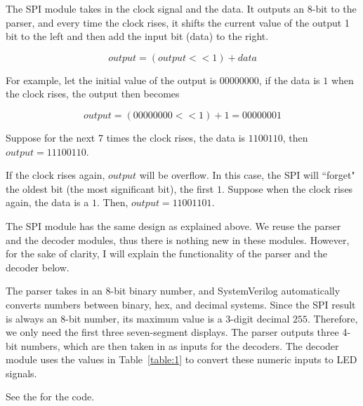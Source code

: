 \documentclass[12pt]{article}
\begin{document}
The SPI module takes in the clock signal and the data. It outputs an 8-bit to the parser, and every time the clock rises, it shifts the current value of the output 1 bit to the left and then add the input bit (data) to the right.

\begin{equation} \label{equation:1}
  output = (output << 1) + data
\end{equation}

For example, let the initial value of the output is $00000000$, if the data is $1$ when the clock rises, the output then becomes

\begin{equation} \label{equation:2}
  output = (00000000 << 1) + 1 = 00000001
\end{equation}

Suppose for the next 7 times the clock rises, the data is $1100110$, then $output = 11100110$.

If the clock rises again, $output$ will be overflow. In this case, the SPI will ``forget" the oldest bit (the most significant bit), the first $1$. Suppose when the clock rises again, the data is a $1$. Then, $output = 11001101$.

The SPI module has the same design as explained above. We reuse the parser and the decoder modules, thus there is nothing new in these modules. However, for the sake of clarity, I will explain the functionality of the parser and the decoder below.

The parser takes in an 8-bit binary number, and SystemVerilog automatically converts numbers between binary, hex, and decimal systems. Since the SPI result is always an 8-bit number, its maximum value is a 3-digit decimal $255$. Therefore, we only need the first three seven-segment displays. The parser outputs three 4-bit numbers, which are then taken in as inputs for the decoders. The decoder module uses the values in Table~\ref{table:1} to convert these numeric inputs to LED signals.

See the  for the code.
\end{document}
